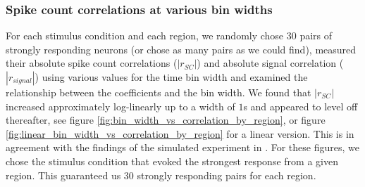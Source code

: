 \documentclass[a4paper,12pt]{article}
\theoremstyle{definition}
\begin{document}
\subsubsection{Spike count correlations at various bin widths}\label{sec:corr_vs_bin_widths}
For each stimulus condition and each region, we randomly chose $30$ pairs of strongly responding neurons (or chose as many pairs as we could find), measured their absolute spike count correlations ($|r_{SC}|$) and absolute signal correlation ($|r_{signal}|$) using various values for the time bin width and examined the relationship between the coefficients and the bin width. We found that $|r_{SC}|$ increased approximately log-linearly up to a width of $1$s and appeared to level off thereafter, see figure \ref{fig:bin_width_vs_correlation_by_region}, or figure \ref{fig:linear_bin_width_vs_correlation_by_region} for a linear version. This is in agreement with the findings of the simulated experiment in \cite{cohen}. For these figures, we chose the stimulus condition that evoked the strongest response from a given region. This guaranteed us $30$ strongly responding pairs for each region.
\end{document}
